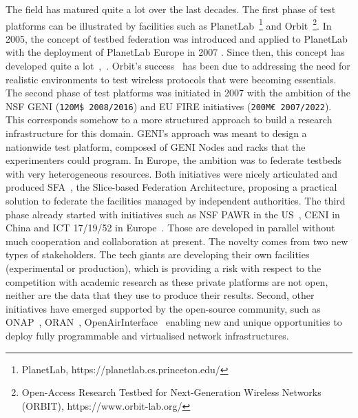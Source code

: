 The field has matured quite a lot over the last decades. The first phase of test platforms can be illustrated by facilities such as PlanetLab~\footnote{PlanetLab, https://planetlab.cs.princeton.edu/} and Orbit~\footnote{Open-Access Research Testbed for Next-Generation Wireless Networks (ORBIT), https://www.orbit-lab.org/}. In 2005, the concept of testbed federation was introduced and applied to PlanetLab with the deployment of PlanetLab Europe in 2007 \cite{planetlab}.  Since then, this concept has developed quite a lot~\cite{fed4fire},~\cite{federation}. Orbit's success~\cite{orbit} has been due to addressing the need for realistic environments to test wireless protocols that were becoming essentials. The second phase of test platforms was initiated in 2007 with the ambition of the NSF GENI \cite{geni} (\verb-120M$ 2008/2016-) and EU FIRE \cite{eu-fire} initiatives (\verb-200M€ 2007/2022-). This corresponds somehow to a more structured approach to build a research infrastructure for this domain. GENI’s approach was meant to design a nationwide test platform, composed of GENI Nodes and racks that the experimenters could program. In Europe, the ambition was to federate testbeds with very heterogeneous resources. Both initiatives were nicely articulated and produced SFA~\cite{sfa}, the Slice-based Federation Architecture, proposing a practical solution to federate the facilities managed  by independent authorities. The third phase already started with initiatives such as NSF PAWR in the US~\cite{pawr}, CENI in China and ICT 17/19/52 in Europe~\cite{5geve, 5genesis, 5gvinni}. Those are developed in parallel without much cooperation and collaboration at present. The novelty comes from two new types of stakeholders. The tech giants are developing their own facilities (experimental or production), which is providing a risk with respect to the competition with academic research as these private platforms are not open, neither are the data that they use to produce their results. Second, other initiatives have emerged supported by the open-source community, such as ONAP~\cite{onap}, ORAN~\cite{oran}, OpenAirInterface~\cite{oai} enabling new and unique opportunities to deploy fully programmable and virtualised network infrastructures.

